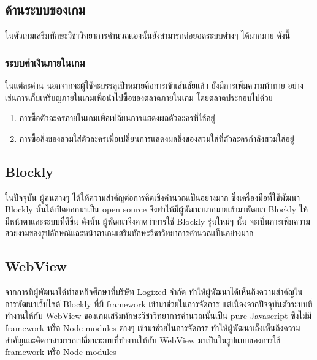 \subsection{ด้านระบบของเกม}
ในตัวเกมเสริมทักษะวิชาวิทยาการคำนวณเองนั้นยังสามารถต่อยอดระบบต่างๆ ได้มากมาย ดังนี้

\subsubsection{ระบบค่าเงินภายในเกม}
ในแต่ละด่าน นอกจากจะผู้ใช้จะบรรลุเป้าหมายคือการเข้าเส้นชัยแล้ว ยังมีการเพิ่มความท้าทาย อย่างเช่นการเก็บเหรียญภายในเกมเพื่อนำไปซื้อของตลาดภายในเกม 
โดยตลาดประกอบไปด้วย
\begin{enumerate}
    \item การซื้อตัวละครภายในเกมเพื่อเปลี่ยนการแสดงผลตัวละครที่ใช้อยู่
    \item การซื้อสิ่งของสวมใส่ตัวละครเพื่อเปลี่ยนการแสดงผลสิ่งของสวมใส่ที่ตัวละครกำลังสวมใส่อยู่
\end{enumerate}

\subsection{Blockly}
ในปัจจุบัน ผู้คนต่างๆ ได้ให้ความสำคัญต่อการคิดเชิงคำนวณเป็นอย่างมาก ซึ่งเครื่องมือที่ใช้พัฒนา Blockly นั้นได้เปิดออกมาเป็น open source
จึงทำให้มีผู้พัฒนามากมายเข้ามาพัฒนา Blockly ให้มีหน้าตาและระบบที่ดีขึ้น ดังนั้น ผู้พัฒนาจึงคาดว่าการใช้ Blockly รุ่นใหม่ๆ นั้น
จะเป็นการเพิ่มความสวยงามของรูปลักษณ์และหน้าตาเกมเสริมทักษะวิชาวิทยาการคำนวณเป็นอย่างมาก

\subsection{WebView}
จากการที่ผู้พัฒนาได้ทำสหกิจศึกษาที่บริษัท Logixed จำกัด ทำให้ผู้พัฒนาได้เห็นถึงความสำคัญในการพัฒนาเว็บไซต์ Blockly ที่มี framework เข้ามาช่วยในการจัดการ
แต่เนื่องจากปัจจุบันตัวระบบที่ทำงานให้กับ WebView ของเกมเสริมทักษะวิชาวิทยาการคำนวณนั้นเป็น pure Javascript ซึ่งไม่มี framework หรือ Node modules ต่างๆ เข้ามาช่วยในการจัดการ
ทำให้ผู้พัฒนาเล็งเห็นถึงความสำคัญและคิดว่าสามารถเปลี่ยนระบบที่ทำงานให้กับ WebView มาเป็นในรูปแบบของการใช้ framework หรือ Node modules


